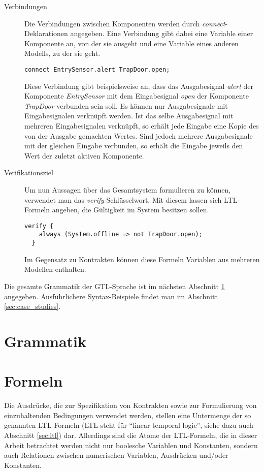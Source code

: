 \begin{description}
\item[Verbindungen] Die Verbindungen zwischen Komponenten werden durch \emph{connect}-Deklarationen angegeben.
Eine Verbindung gibt dabei eine Variable einer Komponente an, von der sie ausgeht und eine Variable eines anderen Modells, zu der sie geht.
\begin{lstlisting}[language=gtl]
  connect EntrySensor.alert TrapDoor.open;
\end{lstlisting}
Diese Verbindung gibt beispielsweise an, dass das Ausgabesignal \emph{alert} der Komponente \emph{EntrySensor} mit dem Eingabesignal \emph{open} der Komponente \emph{TrapDoor} verbunden sein soll.
Es können nur Ausgabesignale mit Eingabesignalen verknüpft werden.
Ist das selbe Ausgabesignal mit mehreren Eingabesignalen verknüpft, so erhält jede Eingabe eine Kopie des von der Ausgabe gemachten Wertes.
Sind jedoch mehrere Ausgabesignale mit der gleichen Eingabe verbunden, so erhält die Eingabe jeweils den Wert der zuletzt aktiven Komponente.

\item[Verifikationsziel] Um nun Aussagen über das Gesamtsystem formulieren zu können, verwendet man das \emph{verify}-Schlüsselwort.
Mit diesem lassen sich LTL-Formeln angeben, die Gültigkeit im System besitzen sollen.
\begin{lstlisting}[language=gtl]
  verify {
    always (System.offline => not TrapDoor.open);
  }
\end{lstlisting}
Im Gegensatz zu Kontrakten können diese Formeln Variablen aus mehreren Modellen enthalten.
\end{description}
Die gesamte Grammatik der GTL-Sprache ist im nächsten Abschnitt \ref{sec:grammar} angegeben.
Ausführlichere Syntax-Beispiele findet man im Abschnitt \ref{sec:case_studies}.

\section{Grammatik}
\label{sec:grammar}


\section{Formeln}
\label{sec:formula}
Die Ausdrücke, die zur Spezifikation von Kontrakten sowie zur Formulierung von einzuhaltenden Bedingungen verwendet werden, stellen eine Untermenge der so genannten LTL-Formeln (LTL steht für "`linear temporal logic"', siehe dazu auch Abschnitt \ref{sec:ltl}) dar.
Allerdings sind die Atome der LTL-Formeln, die in dieser Arbeit betrachtet werden nicht nur boolesche Variablen und Konstanten, sondern auch Relationen zwischen numerischen Variablen, Ausdrücken und/oder Konstanten.

